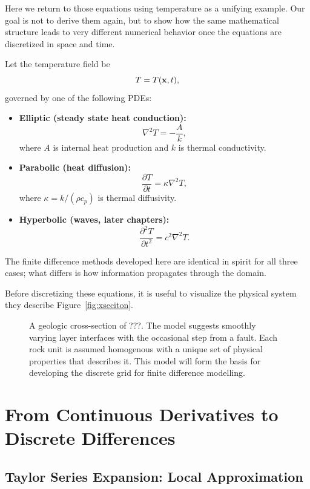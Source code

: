 Here we return to those equations using temperature as a unifying example.  Our goal is not to derive them again, but to show how the same mathematical structure leads to very different numerical behavior once the equations are discretized in space and time.

Let the temperature field be
\[
T = T(\vb{x},t),
\]
governed by one of the following PDEs:

\begin{itemize}
  \item \textbf{Elliptic (steady state heat conduction):}
  \[
  \nabla^2 T = -\frac{A}{k},
  \]
  where $A$ is internal heat production and $k$ is thermal conductivity.

  \item \textbf{Parabolic (heat diffusion):}
  \[
  \frac{\partial T}{\partial t} = \kappa \nabla^2 T,
  \]
  where $\kappa = k/(\rho c_p)$ is thermal diffusivity.

  \item \textbf{Hyperbolic (waves, later chapters):}
  \[
  \frac{\partial^2 T}{\partial t^2} = c^2 \nabla^2 T.
  \]
\end{itemize}

The finite difference methods developed here are identical in spirit for all three cases; what differs is how information propagates through the domain.

Before discretizing these equations, it is useful to visualize the physical system they describe Figure~\ref{fig:xseciton}.

\begin{figure}
    \centering
    \caption{A geologic cross-section of ???.  The model suggests smoothly varying layer interfaces with the occasional step from a fault. Each rock unit is assumed homogenous with a unique set of physical properties that describes it. This model will form the basis for developing the discrete grid for finite difference modelling.}
    \label{ref:xsection}
\end{figure}


\section{From Continuous Derivatives to Discrete Differences}

\subsection{Taylor Series Expansion: Local Approximation}

